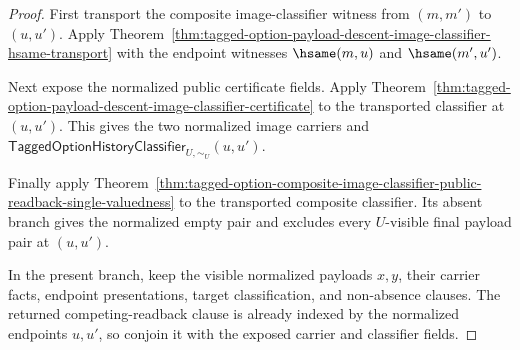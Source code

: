 \begin{proof}
First transport the composite image-classifier witness from $(m,m')$ to
$(u,u')$. Apply
Theorem~\ref{thm:tagged-option-payload-descent-image-classifier-hsame-transport}
with the endpoint witnesses $\hsame(m,u)$ and $\hsame(m',u')$.

Next expose the normalized public certificate fields. Apply
Theorem~\ref{thm:tagged-option-payload-descent-image-classifier-certificate}
to the transported classifier at $(u,u')$. This gives the two normalized image
carriers and $\mathsf{TaggedOptionHistoryClassifier}_{U,\sim_U}(u,u')$.

Finally apply
Theorem~\ref{thm:tagged-option-composite-image-classifier-public-readback-single-valuedness}
to the transported composite classifier. Its absent branch gives the normalized
empty pair and excludes every $U$-visible final payload pair at $(u,u')$.

In the present branch, keep the visible normalized payloads $x,y$, their carrier
facts, endpoint presentations, target classification, and non-absence clauses.
The returned competing-readback clause is already indexed by the normalized
endpoints $u,u'$, so conjoin it with the exposed carrier and classifier fields.
\end{proof}

